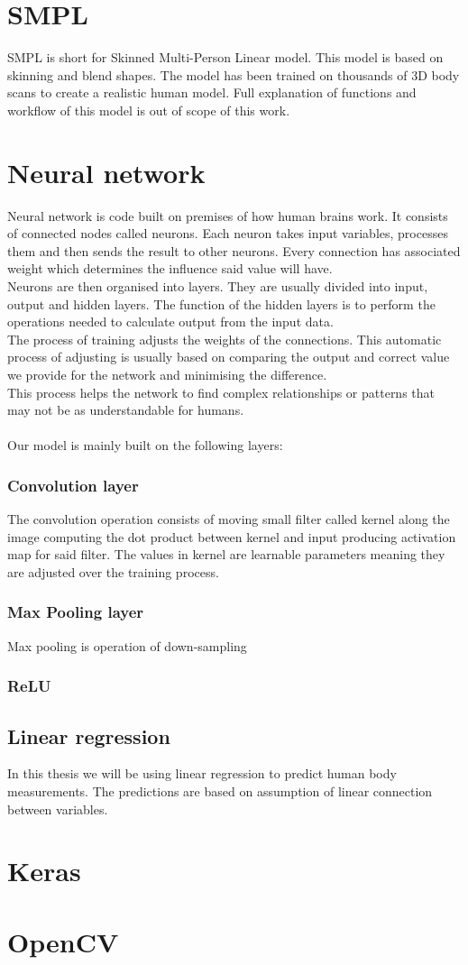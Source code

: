 \section{SMPL}
SMPL is short for Skinned Multi-Person Linear model. This model is based on skinning and blend shapes. The model has been trained on thousands of 3D body scans to create a realistic human model. Full explanation of functions and workflow of this model is out of scope of this work.

\section{Neural network}
Neural network is code built on premises of how human brains work. It consists of connected nodes called neurons. Each neuron takes input variables, processes them and then sends the result to other neurons. Every connection has associated weight which determines the influence said value will have.\\
Neurons are then organised into layers. They are usually divided into input, output and hidden layers. The function of the hidden layers is to perform the operations needed to calculate output from the input data.\\
The process of training adjusts the weights of the connections. This automatic process of adjusting is usually based on comparing the output and correct value we provide for the network and minimising the difference.\\
This process helps the network to find complex relationships or patterns that may not  be as understandable for humans. \\\\
Our model is mainly built on the following layers:
\subsubsection{Convolution layer}
The convolution operation consists of moving small filter called kernel along the image computing the dot product between kernel and input producing activation map for said filter.  The values in kernel are learnable parameters meaning they are adjusted over the training process.
\subsubsection{Max Pooling layer}
Max pooling is operation of down-sampling 
\subsubsection{ReLU}
\subsection{Linear regression}
In this thesis we will be using linear regression to predict human body measurements. The predictions are based on assumption of linear connection between variables. 

\section{Keras}
\section{OpenCV}